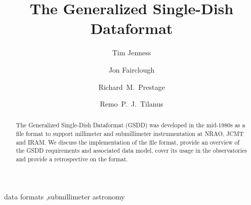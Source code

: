 \documentclass[final,authoryear,5p,times,twocolumn]{elsarticle}
\begin{document}
\begin{frontmatter}



\title{The Generalized Single-Dish Dataformat}


\author[jac]{Tim Jenness}
\author[hp]{Jon Fairclough}
\author[nrao]{Richard~M.~Prestage}
\author[leiden,imapp]{Remo~P.~J.~Tilanus}


\address[jac]{Joint Astronomy Centre, 660 N.\ A`oh\=ok\=u Place, Hilo, HI
  96720, USA}
\address[hp]{HP Enterprise Services UK Ltd}
\address[nrao]{National Radio Astronomy Observatory, P.O.\ Box 2, Green Bank, WV~24944, USA}
\address[leiden]{Leiden Observatory, Leiden University, PO Box 9513, 2300 RA Leiden, The~Netherlands}
\address[imapp]{Department of Astrophysics,
     Institute for Mathematics, Astrophysics and Particle Physics,
     Radboud University Nijmegen, PO Box 9010, 6500 GL Nijmegen, The~Netherlands}

\begin{abstract}

The Generalized Single-Dish Dataformat (GSDD) was developed in the
mid-1980s as a file format to support millimeter and submillimeter
instrumentation at NRAO, JCMT and IRAM. We discuss the implementation
of the file format, provide an overview of the GSDD requirements and
associated data model, cover its usage in the observatories and
provide a retrospective on the format.

\end{abstract}

\begin{keyword}


data formats \sep submillimeter astronomy

\end{keyword}

\end{frontmatter}
\end{document}
